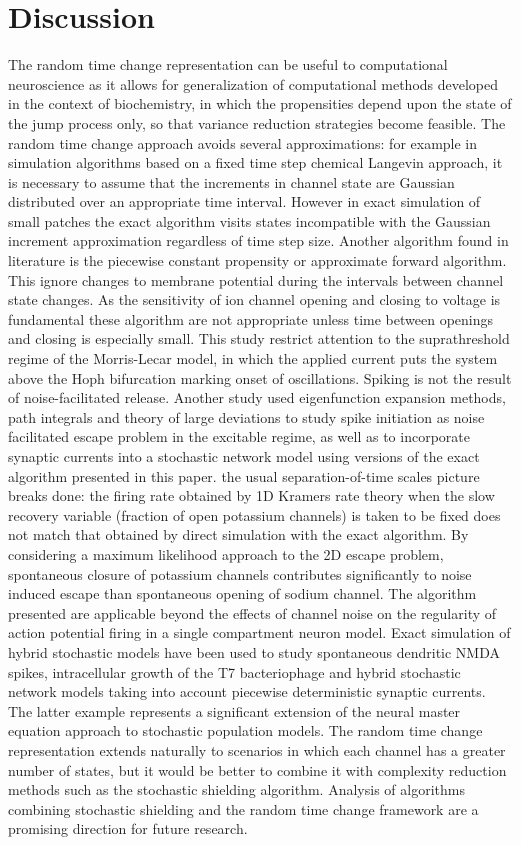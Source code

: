 \section{Discussion}
The random time change representation can be useful to computational neuroscience as it allows for generalization of computational methods developed in the context of biochemistry, in which the propensities depend upon the state of the jump process only, so that variance reduction strategies become feasible.
The random time change approach avoids several approximations: for example in simulation algorithms based on a fixed time step chemical Langevin approach, it is necessary to assume that the increments in channel state are Gaussian distributed over an appropriate time interval.
However in exact simulation of small patches the exact algorithm visits states incompatible with the Gaussian increment approximation regardless of time step size.
Another algorithm found in literature is the piecewise constant propensity or approximate forward algorithm.
This ignore changes to membrane potential during the intervals between channel state changes.
As the sensitivity of ion channel opening and closing to voltage is fundamental these algorithm are not appropriate unless time between openings and closing is especially small.
This study restrict attention to the suprathreshold regime of the Morris-Lecar model, in which the applied current puts the system above the Hoph bifurcation marking onset of oscillations.
Spiking is not the result of noise-facilitated release.
Another study used eigenfunction expansion methods, path integrals and theory of large deviations to study spike initiation as noise facilitated escape problem in the excitable regime, as well as to incorporate synaptic currents into a stochastic network model using versions of the exact algorithm presented in this paper.
the usual separation-of-time scales picture breaks done: the firing rate obtained by 1D Kramers rate theory when the slow recovery variable (fraction of open potassium channels) is taken to be fixed does not match that obtained by direct simulation with the exact algorithm.
By considering a maximum likelihood approach to the 2D escape problem, spontaneous closure of potassium channels contributes significantly to noise induced escape than spontaneous opening of sodium channel.
The algorithm presented are applicable beyond the effects of channel noise on the regularity of action potential firing in a single compartment neuron model.
Exact simulation of hybrid stochastic models have been used to study spontaneous dendritic NMDA spikes, intracellular growth of the T7 bacteriophage and hybrid stochastic network models taking into account piecewise deterministic synaptic currents.
The latter example represents a significant extension of the neural master equation approach to stochastic population models.
The random time change representation extends naturally to scenarios in which each channel has a greater number of states, but it would be better to combine it with complexity reduction methods such as the stochastic shielding algorithm.
Analysis of algorithms combining stochastic shielding and the random time change framework are a promising direction for future research.




